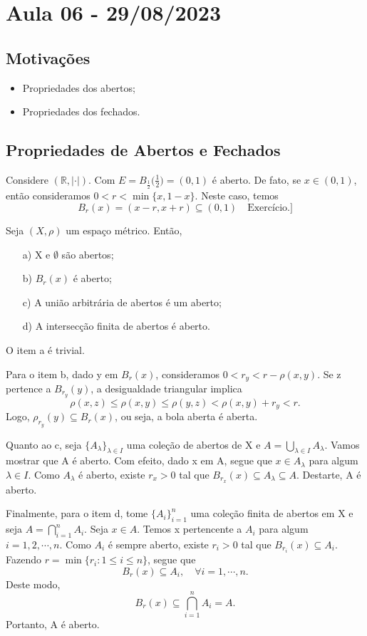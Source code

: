 \documentclass[MetricSpaces/metric_notes.tex]{subfiles}
\begin{document}
\section{Aula 06 - 29/08/2023}
\subsection{Motivações}
\begin{itemize}
	\item Propriedades dos abertos;
	\item Propriedades dos fechados.
\end{itemize}
\subsection{Propriedades de Abertos e Fechados}
\begin{example}
	Considere \((\mathbb{R}, |\cdot |)\). Com \(E = B_{\frac{1}{2}}\biggl(\frac{1}{2}\biggr) = (0, 1)\) é aberto. De fato, se \(x\in(0, 1)\),
	então consideramos \(0 < r < \min\{x, 1-x\}.\) Neste caso, temos
	\[
		B_{r}(x) = (x-r, x+r)\subseteq{(0, 1)}\quad \text{Exercício.]}
	\]
\end{example}
\begin{prop*}
	Seja \((X, \rho )\) um espaço métrico. Então,
	\begin{itemize}
		\item[a)] X e \(\emptyset\) são abertos;
		\item[b)] \(B_{r}(x)\) é aberto;
		\item[c)] A união arbitrária de abertos é um aberto;
		\item[d)] A intersecção finita de abertos é aberto.
	\end{itemize}
\end{prop*}
\begin{proof*}
	O item a é trivial.

	Para o item b, dado y em \(B_{r}(x)\), consideramos \(0 < r_{y} < r - \rho (x, y)\). Se z pertence a \(B_{r_{y}}(y)\), a desigualdade triangular implica
	\[
		\rho (x, z)\leq \rho (x, y)\leq \rho (y, z) < \rho (x, y) + r_{y} < r.
	\]
	Logo, \(\rho_{r_{y}}(y)\subseteq{B_{r}(x)}\), ou seja, a bola aberta é aberta.

	Quanto ao c, seja \(\{A_{\lambda }\}_{\lambda \in I}\) uma coleção de abertos de X e \(A = \bigcup_{\lambda \in I}^{}{A_{\lambda }}\). Vamos mostrar que A é aberto.
	Com efeito, dado x em A, segue que \(x\in A_{\lambda}\) para algum \(\lambda \in I.\) Como \(A_{\lambda }\) é aberto, existe \(r_{x} > 0\) tal que \(B_{r_{x}}(x)\subseteq{A_{\lambda}}\subseteq{A}.\)
	Destarte, A é aberto.

	Finalmente, para o item d, tome \(\{A_{i}\}_{i=1}^{n}\) uma coleção finita de abertos em X e seja \(A = \bigcap_{i=1}^{n}{A_{i}}\). Seja \(x\in A\). Temos x pertencente a \(A_{i}\) para algum \(i=1, 2, \cdots, n\).
	Como \(A_{i}\) é sempre aberto, existe \(r_{i} > 0\) tal que \(B_{r_{i}}(x)\subseteq{A_{i}}.\) Fazendo \(r=\min\{r_{i}: 1\leq i\leq n\}\), segue que
	\[
		B_{r}(x)\subseteq{A_{i}},\quad \forall i=1, \cdots, n.
	\]
	Deste modo,
	\[
		B_{r}(x)\subseteq{\bigcap_{i=1}^{n}{A_{i}}} = A.
	\]
	Portanto, A é aberto. \qedsymbol
\end{proof*}
\end{document}
